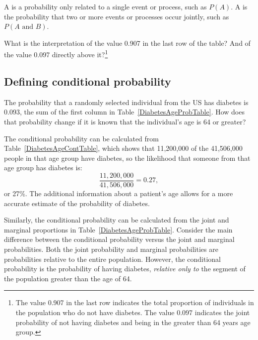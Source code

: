 \begin{termBox}{
A \emph{} is a probability only related to a single event or process, such as $P(A)$. A \emph{} is the probability that two or more events or processes occur jointly, such as $P(A \textrm{ and } B)$.}
\end{termBox}

\begin{exercise} 
  {What is the interpretation of the value 0.907 in the last row of the table?  And of the value 0.097 directly above it?\footnote{The value 0.907 in the last row indicates the total proportion of individuals in the population who do not have diabetes. The value 0.097 indicates the joint probability of not having diabetes and being in the greater than 64 years age group.}}
\label{MarginalJointProbDiabetes}
\end{exercise}


\subsection{Defining conditional probability}


The probability that a randomly selected individual from the US has diabetes is 0.093, the sum of the first column in Table~\ref{DiabetesAgeProbTable}. How does that probability change if it is known that the individual's age is 64 or greater?  

The conditional probability can be calculated from Table~\ref{DiabetesAgeContTable}, which shows that 11,200,000 of the 41,506,000 people in that age group have diabetes, so the likelihood that someone from that age group has diabetes is:
\[  
\frac{11,200,000}{41,506,000} = 0.27,
\]
or 27\%. The additional information about a patient's age allows for a more accurate estimate of the probability of diabetes.

Similarly, the conditional probability can be calculated from the joint and marginal proportions in Table~\ref{DiabetesAgeProbTable}. Consider the main difference between the conditional probability versus the joint and marginal probabilities. Both the joint probability and marginal probabilities are probabilities relative to the entire population. However, the conditional probability is the probability of having diabetes, \textit{relative only to} the segment of the population greater than the age of 64.

